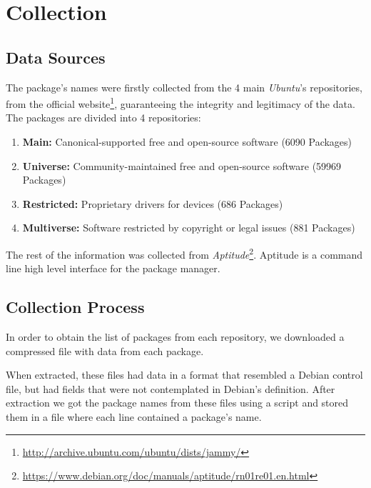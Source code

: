 \section{Collection}
\label{sec:Collection}

\subsection{Data Sources}

The package's names were firstly collected from the 4 main \emph{Ubuntu}'s repositories, from the official website\footnote{\url{http://archive.ubuntu.com/ubuntu/dists/jammy/}}, guaranteeing the integrity and legitimacy of the data. The packages are divided into 4 repositories:

\begin{enumerate}
    \item \textbf{Main: } Canonical-supported free and open-source software (6090 Packages)
    
    \item \textbf{Universe: } Community-maintained free and open-source software (59969 Packages)
    
    \item \textbf{Restricted: } Proprietary drivers for devices (686 Packages)
    
     \item \textbf{Multiverse: } Software restricted by copyright or legal issues (881 Packages)
\end{enumerate}

The rest of the information was collected from \emph{Aptitude}\footnote{\url{https://www.debian.org/doc/manuals/aptitude/rn01re01.en.html}}. Aptitude is a command line high level interface for the package manager.

\subsection{Collection Process}

In order to obtain the list of packages from each repository, we downloaded a compressed file with data from each package\cite{debctrlpackage}. 

When extracted, these files had data in a format that resembled a Debian control file\cite{ubuntuarchive}, but had fields that were not contemplated in Debian’s definition. After extraction we got the package names from these files using a script and stored them in a file where each line contained a package’s name. 

